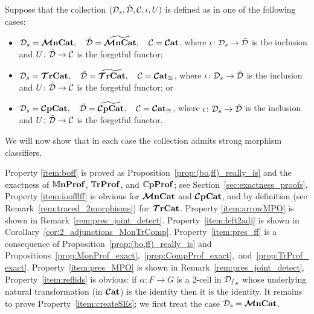 \documentclass[11pt,oneside,article]{memoir}
\begin{document}
\begin{example}
    \label{ex:strictifiable}
  Suppose that the collection $(\mathcal{D}_s,\tilde{\mathcal{D}},\mathcal{C},\iota,U)$ is defined as in one of the
  following cases:
  \begin{itemize}
    \item $\mathcal{D}_s=\bm{\mathcal{M}}\mathbf{nCat}, \quad \tilde{\mathcal{D}}=\widetilde{\bm{\mathcal{M}}\mathbf{nCat}}, \quad \mathcal{C}=\bm{\mathcal{C}}\mathbf{at}$, where
      $\iota\colon\mathcal{D}_s\to\tilde{\mathcal{D}}$ is the inclusion and $U\colon\tilde{\mathcal{D}}\to\mathcal{C}$ is the
      forgetful functor;
    \item $\mathcal{D}_s=\bm{\mathcal{T}}\mathbf{rCat}, \quad \tilde{\mathcal{D}}=\widetilde{\bm{\mathcal{T}}\mathbf{rCat}}, \quad \mathcal{C}=\bm{\mathcal{C}}\mathbf{at}_{\cong}$, where
      $\iota\colon\mathcal{D}_s\to\tilde{\mathcal{D}}$ is the inclusion and $U\colon\tilde{\mathcal{D}}\to\mathcal{C}$ is the
      forgetful functor; or
    \item $\mathcal{D}_s=\bm{\mathcal{C}}\mathbf{pCat}, \quad \tilde{\mathcal{D}}=\widetilde{\bm{\mathcal{C}}\mathbf{pCat}}, \quad \mathcal{C}=\bm{\mathcal{C}}\mathbf{at}_{\cong}$, where
      $\iota\colon\mathcal{D}_s\to\tilde{\mathcal{D}}$ is the inclusion and $U\colon\tilde{\mathcal{D}}\to\mathcal{C}$ is the
      forgetful functor.
  \end{itemize}
  We will now show that in each case the collection admits strong morphism classifiers.

  Property \ref{item:boff} is proved as Proposition~\ref{prop:(bo,ff)_really_is} and the exactness of
  $\mathbb{M}\mathbf{nProf}$, $\mathbb{T}\mathbf{rProf}$, and $\mathbb{C}\mathbf{pProf}$; see Section~\ref{sec:exactness_proofs}. Property
  \ref{item:ioofflff} is obvious for $\bm{\mathcal{M}}\mathbf{nCat}$ and $\bm{\mathcal{C}}\mathbf{pCat}$, and by definition (see
  Remark~\ref{rem:traced_2morphisms}) for $\bm{\mathcal{T}}\mathbf{rCat}$. Property \ref{item:arrowMPO} is shown in
  Remark~\ref{rem:pres_joint_detect}. Property~\ref{item:left2adj} is shown in
  Corollary~\ref{cor:2_adjunctions_MonTrComp}. Property~\ref{item:pres_ff} is a consequence of
  Proposition~\ref{prop:(bo,ff)_really_is} and
  Propositions~\ref{prop:MonProf_exact},~\ref{prop:CompProf_exact},~and~\ref{prop:TrProf_exact}.
  Property~\ref{item:pres_MPO} is shown in Remark~\ref{rem:pres_joint_detect}.
  Property~\ref{item:reflids} is obvious: if $\alpha\colon F\to G$ is a 2-cell in $\mathcal{D_s}_s$ whose
  underlying natural transformation (in $\bm{\mathcal{C}}\mathbf{at}$) is the identity then it is the identity. It remains
  to prove Property~\ref{item:createSEs}; we first treat the case $\mathcal{D}_s=\bm{\mathcal{M}}\mathbf{nCat}$.


\end{example}
\end{document}
